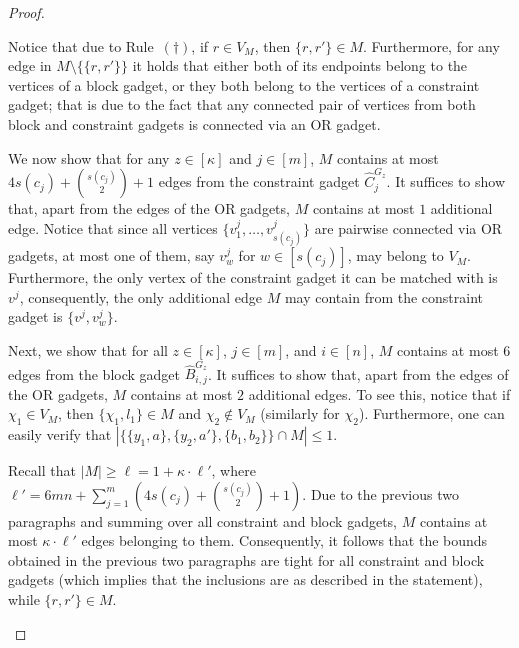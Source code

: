 \begin{proof}
\begin{nestedproof}
\begin{claimproof}
                Notice that due to Rule~$(\dagger)$, if $r \in V_M$, then $\{r,r'\} \in M$.
                Furthermore, for any edge in $M \setminus \{\{r,r'\}\}$ it holds that either both of its endpoints belong to the vertices of a block gadget,
                or they both belong to the vertices of a constraint gadget;
                that is due to the fact that any connected pair of vertices from both block and constraint gadgets is connected via an OR gadget.

                We now show that for any $z \in [\kappa]$ and $j \in [m]$,
                $M$ contains at most $4s(c_j) + \binom{s(c_j)}{2} + 1$ edges from the constraint gadget $\hat{C}^{G_z}_j$.
                It suffices to show that, apart from the edges of the OR gadgets, $M$ contains at most $1$ additional edge.
                Notice that since all vertices $\{v^j_1, \ldots, v^j_{s(c_j)}\}$ are pairwise connected via OR gadgets, at most one of them,
                say $v^j_w$ for $w \in [s(c_j)]$, may belong to $V_M$. Furthermore, the only vertex of the constraint gadget it can be matched with is $v^j$,
                consequently, the only additional edge $M$ may contain from the constraint gadget is $\{v^j,v^j_w\}$.

                Next, we show that for all $z \in [\kappa]$, $j \in [m]$, and $i \in [n]$,
                $M$ contains at most $6$ edges from the block gadget $\hat{B}^{G_z}_{i,j}$.
                It suffices to show that, apart from the edges of the OR gadgets, $M$ contains at most $2$ additional edges.
                To see this, notice that if $\chi_1 \in V_M$, then $\{\chi_1,l_1\} \in M$ and $\chi_2 \notin V_M$ (similarly for $\chi_2$).
                Furthermore, one can easily verify that $|\{\{ y_1, a \}, \{ y_2, a' \}, \{ b_1, b_2 \}\} \cap M| \le 1$.

                Recall that $|M| \ge \ell = 1 + \kappa \cdot \ell'$,
                where $\ell'= 6m n + \sum_{j=1}^m \left(4s(c_j) + \binom{s(c_j)}{2} + 1 \right)$.
                Due to the previous two paragraphs and summing over all constraint and block gadgets,
                $M$ contains at most $\kappa \cdot \ell'$ edges belonging to them.
                Consequently, it follows that the bounds obtained in the previous two paragraphs are tight for all constraint and block gadgets
                (which implies that the inclusions are as described in the statement),
                while $\{r,r'\} \in M$.
            \end{claimproof}



\end{nestedproof}
\end{proof}
